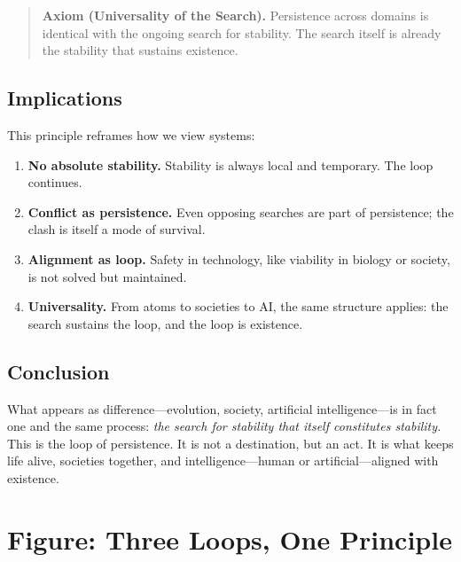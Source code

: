 \documentclass[11pt,a4paper]{article}
\begin{document}
\begin{quote}
\textbf{Axiom (Universality of the Search).}  
Persistence across domains is identical with the ongoing search for stability.  
The search itself is already the stability that sustains existence.
\end{quote}

\subsection*{Implications}
This principle reframes how we view systems:  
\begin{enumerate}[label=\textbf{\arabic*.}]
  \item \textbf{No absolute stability.} Stability is always local and temporary. The loop continues.  
  \item \textbf{Conflict as persistence.} Even opposing searches are part of persistence; the clash is itself a mode of survival.  
  \item \textbf{Alignment as loop.} Safety in technology, like viability in biology or society, is not solved but maintained.  
  \item \textbf{Universality.} From atoms to societies to AI, the same structure applies: the search sustains the loop, and the loop is existence.  
\end{enumerate}

\subsection*{Conclusion}
What appears as difference---evolution, society, artificial intelligence---is in fact one and the same process:  
\emph{the search for stability that itself constitutes stability.}  
This is the loop of persistence. 
It is not a destination, but an act. 
It is what keeps life alive, societies together, and intelligence---human or artificial---aligned with existence.  

\section*{Figure: Three Loops, One Principle}
\end{document}
